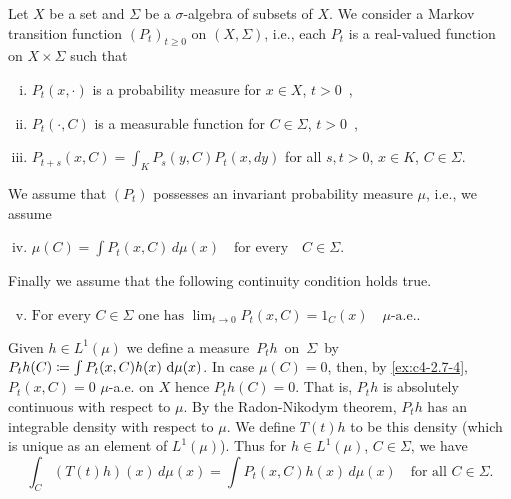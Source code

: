 \begin{example}\label{ex:c4-2.8}
Let $X$ be a set and $\Sigma$ be a $\sigma$-algebra of subsets of $X$.
We consider a Markov transition function $(P_{t})_{t \geq 0}$ on $(X,\Sigma)$, i.e., each $P_{t}$ is a real-valued function on $X \times \Sigma$ such that

\begin{enumerate}[(i)]
\item \label{ex:c4-2.7-1}
$P_{t}(x,\cdot)$ is a probability measure for $x \in X$, $t > 0$\, ,
\item \label{ex:c4-2.7-2}
$P_{t}(\cdot,C)$ is a measurable function for $C \in \Sigma$, $t > 0$\, ,
\item \label{ex:c4-2.7-3}
$P_{t+s}(x,C) = \int_{K} P_{s}(y,C)P_{t}(x,dy)$ for all $s,t>0$, $x \in K$, $C \in \Sigma$.
\end{enumerate}

We assume that $(P_{t})$ possesses an invariant probability measure $\mu$, i.e., we assume
\begin{enumerate}[(i)]
\setcounter{enumi}{3}
\item \label{ex:c4-2.7-4}
$\mu(C) = \int P_{t}(x,C) \, d\mu(x) \quad \text{for every} \quad C \in \Sigma$.
\end{enumerate}

Finally we assume that the following continuity condition holds true.
\begin{enumerate}[(i)]
\setcounter{enumi}{4}
\item \label{ex:c4-2.7-5}
$\text{For every } C \in \Sigma \text{ one has } \lim_{t \to 0} P_{t}(x,C) = 1_{C}(x) \quad \mu\text{-a.e.} .$
\end{enumerate}

Given $h \in L^{1}(\mu)$ we define a measure\, $P_{t}h$\, on\, $\Sigma$\, by\\
 $P_{t}h(C) \coloneqq \int P_{t}(x,C)h(x) \, \mathop{}\!\mathrm{d}{\mu(x)}$.
In case $\mu(C) = 0$, then, by \ref{ex:c4-2.7-4}, $P_{t}(x,C) = 0$ $\mu$-a.e. on $X$ hence $P_{t}h(C) = 0$.
That is, $P_{t}h$ is absolutely continuous with respect to $\mu$.
By the Radon-Nikodym theorem, $P_{t}h$ has an integrable density with respect to $\mu$.
We define $T(t)h$ to be this density (which is unique as an element of $L^{1}(\mu)$).
Thus for $h \in L^{1}(\mu)$, $C \in \Sigma$, we have
\begin{equation}\label{eq:c4-2.8}
\int_{C}(T(t)h)(x) \, d\mu(x) = \int P_{t}(x,C)h(x) \, d\mu(x) \quad \text{for all } C \in \Sigma.
\end{equation}


\end{example}
